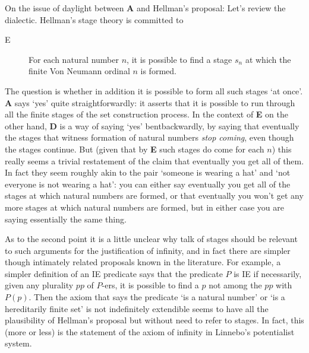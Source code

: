 \documentclass{asl}
\theoremstyle{definition}
\begin{document}
On the issue of daylight between {\bf A} and Hellman's proposal: Let's review the dialectic. Hellman's stage theory is committed to \begin{description} \item[E] For each natural number $n$, it is possible to find a stage $s_n$ at which the finite Von Neumann ordinal $n$ is formed.\end{description} 
The question is whether in addition it is possible to form all such stages `at once'. {\bf A} says `yes' quite straightforwardly: it asserts that it is possible to run through all the finite stages of the set construction process. In the context of {\bf E} on the other hand, {\bf D} is a way of saying `yes' bentbackwardly, by saying that eventually the stages that witness formation of natural numbers \emph{stop coming}, even though the stages continue. But (given that by {\bf E} such stages do come for each $n$) this really seems a trivial restatement of the claim that eventually you get all of them.  In fact they seem roughly akin to the pair `someone is wearing a hat' and `not everyone is not wearing a hat': you can either say eventually you get all of the stages at which natural numbers are formed, or that eventually you won't get any more stages at which natural numbers are formed, but in either case you are saying essentially the same thing.

As to the second point it is a little unclear why talk of stages should be relevant to such arguments for the justification of infinity, and in fact there are simpler though intimately related proposals known in the literature. For example, a simpler definition of an IE predicate says that the predicate $P$ is IE if necessarily, given any plurality $pp$ of $P$-ers, it is possible to find a $p$ not among the $pp$ with $P(p)$. Then the axiom that says the predicate `is a natural number' or `is a hereditarily finite set' is not indefinitely extendible seems to have all the plausibility of Hellman's proposal but without need to refer to stages. In fact, this (more or less) is the statement of the axiom of infinity in Linnebo's potentialist system.
\end{document}

